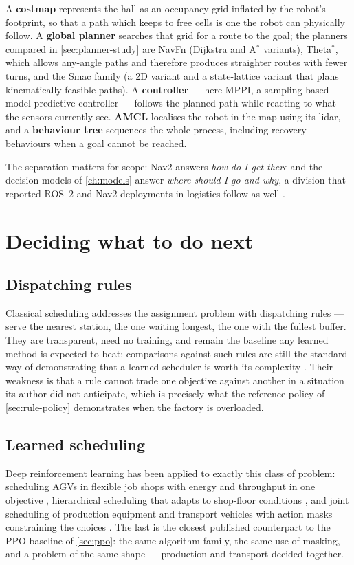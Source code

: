 A \textbf{costmap} represents the hall as an occupancy grid inflated by the robot's footprint, so
that a path which keeps to free cells is one the robot can physically follow. A \textbf{global
planner} searches that grid for a route to the goal; the planners compared in
\cref{sec:planner-study} are NavFn (Dijkstra and A$^{*}$ variants), Theta$^{*}$, which allows
any-angle paths and therefore produces straighter routes with fewer turns, and the Smac family
(a 2D variant and a state-lattice variant that plans kinematically feasible paths). A
\textbf{controller} --- here MPPI, a sampling-based model-predictive controller --- follows the
planned path while reacting to what the sensors currently see. \textbf{AMCL} localises the robot in
the map using its lidar, and a \textbf{behaviour tree} sequences the whole process, including
recovery behaviours when a goal cannot be reached.

The separation matters for scope: Nav2 answers \emph{how do I get there} and the decision models of
\cref{ch:models} answer \emph{where should I go and why}, a division that reported ROS~2 and Nav2
deployments in logistics follow as well \cite{borse2025robotinonav}.

\section{Deciding what to do next}
\label{sec:decision-making}

\subsection{Dispatching rules}
Classical scheduling addresses the assignment problem with dispatching rules --- serve the nearest
station, the one waiting longest, the one with the fullest buffer. They are transparent, need no
training, and remain the baseline any learned method is expected to beat; comparisons against such
rules are still the standard way of demonstrating that a learned scheduler is worth its complexity
\cite{chang2025hierarchicalagv}. Their weakness is that a rule cannot trade one objective against
another in a situation its author did not anticipate, which is precisely what the reference policy
of \cref{sec:rule-policy} demonstrates when the factory is overloaded.

\subsection{Learned scheduling}
Deep reinforcement learning has been applied to exactly this class of problem: scheduling AGVs in
flexible job shops with energy and throughput in one objective
\cite{cheng2025energysavingfjsp}, hierarchical scheduling that adapts to shop-floor conditions
\cite{chang2025hierarchicalagv}, and joint scheduling of production equipment and transport
vehicles with action masks constraining the choices \cite{zhang2025dualresource}. The last is the
closest published counterpart to the PPO baseline of \cref{sec:ppo}: the same algorithm family,
the same use of masking, and a problem of the same shape --- production and transport decided
together.

